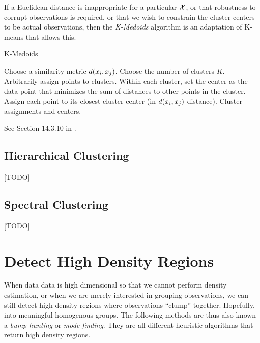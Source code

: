 If a Euclidean distance is inappropriate for a particular $\mathcal{X}$, or that robustness to corrupt observations is required, or that we wish to constrain the cluster centers to be actual observations, then the \emph{K-Medoids} algorithm is an adaptation of K-means that allows this.

\begin{algorithm}[H]
\caption{K-Medoids}
\begin{algorithmic}
\State Choose a similarity metric $d(x_i,x_j)$.
\State Choose the number of clusters $K$.
\State Arbitrarily assign points to clusters.
	\State Within each cluster, set the center as the data point that minimizes the sum of distances to other points in the cluster.
	\State Assign each point to its closest cluster center (in $d(x_i,x_j)$ distance).
\EndWhile
\State \Return Cluster assignments and centers.
\end{algorithmic}
\end{algorithm}


See Section 14.3.10 in \cite{hastie_elements_2003}.




\subsection{Hierarchical Clustering}
\label{sec:hierarchical}
[TODO]




\subsection{Spectral Clustering}
\label{sec:spectral_clustering}
[TODO]






\section{Detect High Density Regions}
\label{sec:high_density}

When data data is high dimensional so that we cannot perform density estimation, or when we are merely interested in grouping observations, we can still detect high density regions where observations ``clump'' together. Hopefully, into meaningful homogenous groups.
The following methods are thus also known a \emph{bump hunting} or \emph{mode finding}.
They are all different heuristic algorithms that return high density regions. 

